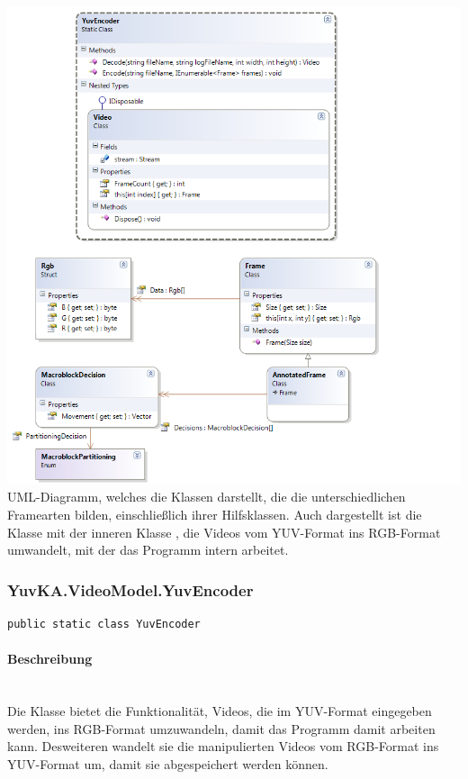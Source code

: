 	
\includegraphics[width=\textwidth]{YuvKA.VideoModel/videomodel.png}
UML-Diagramm, welches die Klassen darstellt, die die unterschiedlichen Framearten bilden, einschließlich ihrer Hilfsklassen. Auch dargestellt ist die Klasse  mit der inneren Klasse , die Videos vom YUV-Format ins RGB-Format umwandelt, mit der das Programm intern arbeitet.

\subsubsection{YuvKA.VideoModel.YuvEncoder}

\begin{verbatim}
public static class YuvEncoder
\end{verbatim}

\paragraph{Beschreibung}~\\
Die Klasse  bietet die Funktionalität, Videos, die im YUV-Format eingegeben werden, ins RGB-Format umzuwandeln, damit das Programm damit arbeiten kann. Desweiteren wandelt sie die manipulierten Videos vom RGB-Format ins YUV-Format um, damit sie abgespeichert werden können.

